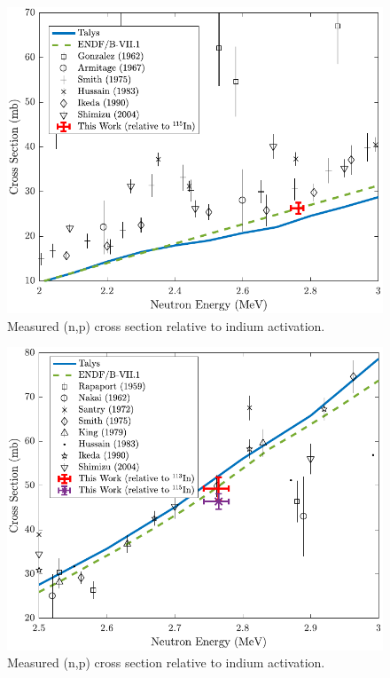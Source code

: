 \documentclass[5p]{elsarticle}
\begin{document}
\begin{figure}
 \centering
 \includegraphics[scale=0.65]{./figures/47sc_fixed_1point.pdf}
 \caption{Measured (n,p) cross section relative to indium activation.}
 \label{fig:sc_xs}
\end{figure}



\begin{figure}
 \centering
 \includegraphics[scale=0.65]{./figures/64cu_fixed_1point.pdf}
 \caption{Measured (n,p) cross section relative to indium activation.}
 \label{fig:cu_xs_zoom}
\end{figure}
\end{document}
